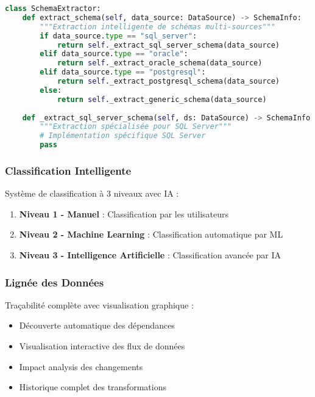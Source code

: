 \documentclass[12pt,a4paper]{article}
\begin{document}
\begin{lstlisting}[language=Python, caption=Algorithme d'extraction de schémas]
class SchemaExtractor:
    def extract_schema(self, data_source: DataSource) -> SchemaInfo:
        """Extraction intelligente de schémas multi-sources"""
        if data_source.type == "sql_server":
            return self._extract_sql_server_schema(data_source)
        elif data_source.type == "oracle":
            return self._extract_oracle_schema(data_source)
        elif data_source.type == "postgresql":
            return self._extract_postgresql_schema(data_source)
        else:
            return self._extract_generic_schema(data_source)
    
    def _extract_sql_server_schema(self, ds: DataSource) -> SchemaInfo:
        """Extraction spécialisée pour SQL Server"""
        # Implémentation spécifique SQL Server
        pass
\end{lstlisting}

\subsubsection{Classification Intelligente}
Système de classification à 3 niveaux avec IA :

\begin{enumerate}
    \item \textbf{Niveau 1 - Manuel} : Classification par les utilisateurs
    \item \textbf{Niveau 2 - Machine Learning} : Classification automatique par ML
    \item \textbf{Niveau 3 - Intelligence Artificielle} : Classification avancée par IA
\end{enumerate}

\subsubsection{Lignée des Données}
Traçabilité complète avec visualisation graphique :

\begin{itemize}
    \item Découverte automatique des dépendances
    \item Visualisation interactive des flux de données
    \item Impact analysis des changements
    \item Historique complet des transformations
\end{itemize}
\end{document}

